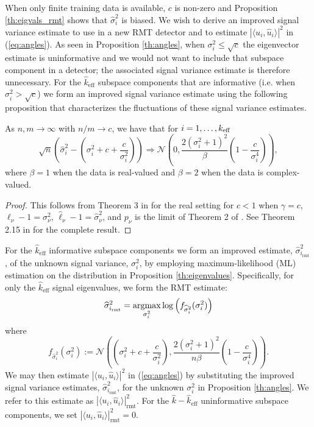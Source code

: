 When only finite training data is available, $c$ is non-zero and Proposition \ref{th:eigvals_rmt} shows that $\widehat{\sigma}_i^2$ is biased. We wish to derive an improved signal variance estimate to use in a new RMT detector and to estimate $|\langle u_i,\widehat{u}_i\rangle|^2$ in (\ref{eq:angles}). As seen in Proposition \ref{th:angles}, when $\sigma_i^2\leq\sqrt{c}$ the eigenvector estimate is uninformative and we would not want to include that subspace component in a detector; the associated signal variance estimate is therefore unnecessary. For the $\widehat{k}_{\text{eff}}$ subspace components that are informative (i.e. when $\sigma_i^2 > \sqrt{c}$) we form an improved signal variance estimate using the following proposition that characterizes the fluctuations of these signal variance estimates.
\begin{prop}\label{th:eigenvalues}
As $n,m \longrightarrow \infty$ with $n/m \to c$, we have that for $i = 1, \ldots, k_\text{eff}$
\begin{equation*}
\sqrt{n}\left(\widehat{\sigma}_i^2-\left(\sigma_i^2+c+\frac{c}{\sigma_i^2}\right)\right)\Rightarrow\mathcal{N}\left(0,\frac{2\left(\sigma_i^2+1\right)^2}{\beta }\left(1-\frac{c}{\sigma_i^4}\right)\right),
\end{equation*}
where $\beta = 1$ when the data is real-valued and $\beta = 2$ when the data is complex-valued.
\end{prop}
\begin{proof}
This follows from Theorem 3 in \cite{paul2007asymptotics} for the real setting for $c<1$ when $\gamma=c$, $\ell_\nu-1=\sigma_\nu^2$, $\widehat{\ell}_\nu-1=\widehat{\sigma}_\nu^2$, and $p_\nu$ is the limit of Theorem 2 of \cite{paul2007asymptotics}. See Theorem 2.15 in \cite{benaych2011singular} for the complete result.
\end{proof}
For the $\widehat{k}_{\text{eff}}$ informative subspace components we form an improved estimate, $\widehat{\sigma}^2_{i_\text{rmt}}$, of the unknown signal variance, $\sigma_{i}^{2}$, by employing maximum-likelihood (ML) estimation on the distribution in Proposition \ref{th:eigenvalues}. Specifically, for only the $\widehat{k}_{\text{eff}}$ signal eigenvalues, we form the RMT estimate:
\begin{equation}\label{eq:cov}
\widehat{\sigma}^2_{i_\text{rmt}} = \argmax_{\sigma_i^2} \log\left(f_{\widehat{\sigma}_i^2}(\sigma_i^2)\right)
\end{equation}
where
\begin{equation*}
f_{\widehat{\sigma}_i^2}(\sigma_i^2):=\mathcal{N}\left(\left(\sigma_i^2+c+\frac{c}{\sigma_i^2}\right),\frac{2\left(\sigma_i^2+1\right)^2}{n\beta }\left(1-\frac{c}{\sigma_i^4}\right)\right).
\end{equation*}
We may then estimate $|\langle u_i,\widehat{u}_i\rangle|^2$ in (\ref{eq:angles}) by substituting the improved signal variance estimates, $\widehat{\sigma}^2_{i_\text{rmt}}$, for the unknown $\sigma_i^2$ in Proposition \ref{th:angles}. We refer to this estimate as $|\langle u_i,\widehat{u}_i\rangle|^2_{\text{rmt}}$. For the $\widehat{k}-\widehat{k}_{\text{eff}}$ uninformative subspace components, we set $|\langle u_i,\widehat{u}_i\rangle|^2_{\text{rmt}}=0$.
